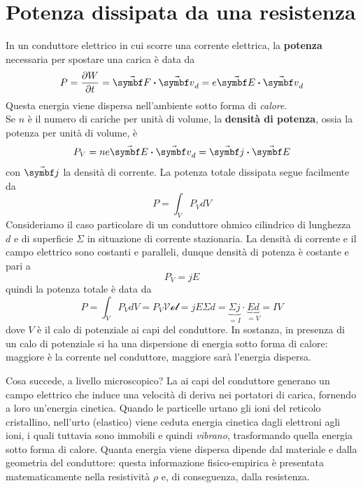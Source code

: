 \section{Potenza dissipata da una resistenza}
In un conduttore elettrico in cui scorre una corrente elettrica, la \textbf{potenza} necessaria per spostare una carica è data da
\begin{equation}
	P=\pdv{W}{t}=\vba{F}\vdot \vba{v}_d=e\vba{E}\vdot\vba{v}_d
\end{equation}
Questa energia viene dispersa nell'ambiente sotto forma di \textit{calore}.\\
Se $n$ è il numero di cariche per unità di volume, la \textbf{densità di potenza}, ossia la potenza per unità di volume, è
\begin{equation}
	P_V=ne\vba{E}\vdot\vba{v}_d=\vba{j}\vdot \vba{E}
\end{equation}
con $\vba{j}$ la densità di corrente. La potenza totale dissipata segue facilmente da
\begin{equation}
	P=\int_{V}P_VdV
\end{equation}
Consideriamo il caso particolare di un conduttore ohmico cilindrico di lunghezza $d$ e di superficie $\Sigma$ in situazione di corrente stazionaria. La densità di corrente e il campo elettrico sono costanti e paralleli, dunque densità di potenza è costante e pari a
\begin{equation}
	P_V=jE
\end{equation}
quindi la potenza totale è data da
\begin{equation*}
	P=\int_{V}P_VdV=P_V\mathcal{Vol}=jE\Sigma d=\underbrace{\Sigma j}_{=I}\cdot\underbrace{Ed}_{=V}=IV
\end{equation*}
dove $V$ è il calo di potenziale ai capi del conduttore. In sostanza, in presenza di un calo di potenziale si ha una dispersione di energia sotto forma di calore: maggiore è la corrente nel conduttore, maggiore sarà l'energia dispersa.

Cosa succede, a livello microscopico? La \ddp ai capi del conduttore generano un campo elettrico che induce una velocità di deriva nei portatori di carica, fornendo a loro un'energia cinetica. Quando le particelle urtano gli ioni del reticolo cristallino, nell'urto (elastico) viene ceduta energia cinetica dagli elettroni agli ioni, i quali tuttavia sono immobili e quindi \textit{vibrano}, trasformando quella energia sotto forma di calore. Quanta energia viene dispersa dipende dal materiale e dalla geometria del conduttore: questa informazione fisico-empirica è presentata matematicamente nella resistività $\rho$ e, di conseguenza, dalla resistenza.


